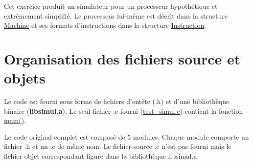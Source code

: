 \-Cet exercice produit un simulateur pour un processeur hypothétique et extrêmement simplifié. \-Le processeur lui-\/même est décrit dans la structure \hyperlink{struct_machine}{\-Machine} et ses formats d'instructions dans la structure \hyperlink{union_instruction}{\-Instruction}.\hypertarget{index_code}{}\section{\-Organisation des fichiers source et objets}\label{index_code}
\-Le code est fourni sous forme de fichiers d'entête ({\ttfamily }.h) et d'une bibliothèque binaire ({\bfseries libsimul.\-a}). \-Le seul fichier {\ttfamily }.c fourni ({\ttfamily \hyperlink{test__simul_8c}{test\-\_\-simul.\-c}}) contient la fonction \hyperlink{test__simul_8c_a0ddf1224851353fc92bfbff6f499fa97}{main()}.

\-Le code original complet est composé de 5 modules. \-Chaque module comporte un fichier {\ttfamily }.h et un {\ttfamily }.c de même nom. \-Le fichier-\/source {\ttfamily }.c n'est pas fourni mais le fichier-\/objet correspondant figure dans la bibliothèque {\ttfamily libsimul.\-a}.


